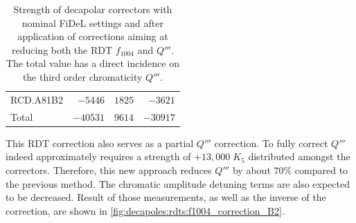 \begin{table}[!htb]
\begin{tabular}{lrrr}
    \hspace{2mm}RCD.A81B2 &$-5446$ & $1825 $ &  $-3621 $\\
    \hspace{2mm}Total     &$-40531$& $9614 $ &  $-30917$      \\
    \bottomrule
    \end{tabular}
    \caption{Strength of decapolar correctors with nominal FiDeL settings and after application of
    corrections aiming at reducing both the RDT $f_{1004}$ and $Q'''$. The total value has a direct
    incidence on the third order chromaticity $Q'''$.}
    \label{tab:decapoles:rdts:correction_f1004_k5}
\end{table}

This RDT correction also serves as a partial $Q'''$ correction. To fully correct $Q'''$ indeed
approximately requires a strength of $+13,000 \;K_5$ distributed amongst the correctors. Therefore,
this new approach reduces $Q'''$ by about $70\%$ compared to the previous method. The chromatic
amplitude detuning terms are also expected to be decreased.
Result of those measurements, as well as the inverse of the correction, are shown in 
\cref{fig:decapoles:rdts:f1004_correction_B2}.

